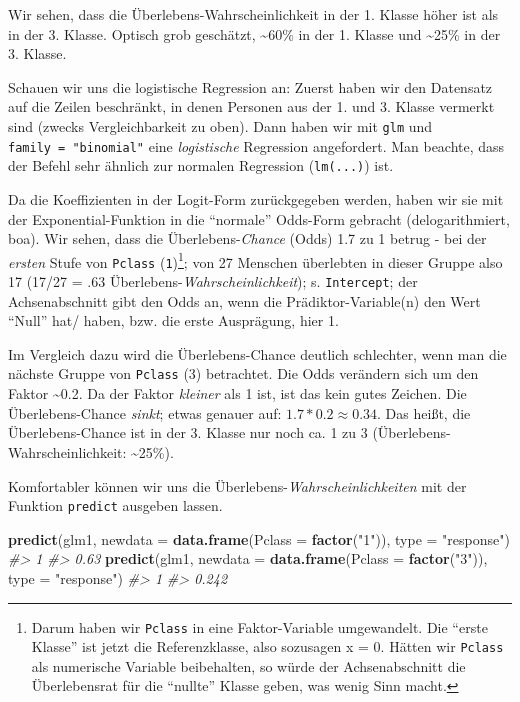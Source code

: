 \documentclass[12pt,ngerman,]{book}
\makeatletter
\newenvironment{Shaded}{\begin{snugshade}}{\end{snugshade}}
\newcommand{\KeywordTok}[1]{\textcolor[rgb]{0.13,0.29,0.53}{\textbf{{#1}}}}
\newcommand{\DataTypeTok}[1]{\textcolor[rgb]{0.13,0.29,0.53}{{#1}}}
\newcommand{\StringTok}[1]{\textcolor[rgb]{0.31,0.60,0.02}{{#1}}}
\newcommand{\CommentTok}[1]{\textcolor[rgb]{0.56,0.35,0.01}{\textit{{#1}}}}
\newcommand{\NormalTok}[1]{{#1}}
\let\rmarkdownfootnote\footnote%
\def\footnote{\protect\rmarkdownfootnote}
\newenvironment{kframe}{%
\medskip{}
\setlength{\fboxsep}{.8em}
 \def\at@end@of@kframe{}%
 \ifinner\ifhmode%
  \def\at@end@of@kframe{\end{minipage}}%
  \begin{minipage}{\columnwidth}%
 \fi\fi%
 \def\FrameCommand##1{\hskip\@totalleftmargin \hskip-\fboxsep
 \colorbox{shadecolor}{##1}\hskip-\fboxsep
     \hskip-\linewidth \hskip-\@totalleftmargin \hskip\columnwidth}%
 \MakeFramed {\advance\hsize-\width
   \@totalleftmargin\z@ \linewidth\hsize
   \@setminipage}}%
 {\par\unskip\endMakeFramed%
 \at@end@of@kframe}
\renewenvironment{Shaded}{\begin{kframe}}{\end{kframe}}
\makeatother
\begin{document}
Wir sehen, dass die Überlebens-Wahrscheinlichkeit in der 1. Klasse höher
ist als in der 3. Klasse. Optisch grob geschätzt, \textasciitilde{}60\%
in der 1. Klasse und \textasciitilde{}25\% in der 3. Klasse.

Schauen wir uns die logistische Regression an: Zuerst haben wir den
Datensatz auf die Zeilen beschränkt, in denen Personen aus der 1. und 3.
Klasse vermerkt sind (zwecks Vergleichbarkeit zu oben). Dann haben wir
mit \texttt{glm} und \texttt{family\ =\ "binomial"} eine
\emph{logistische} Regression angefordert. Man beachte, dass der Befehl
sehr ähnlich zur normalen Regression (\texttt{lm(...)}) ist.

Da die Koeffizienten in der Logit-Form zurückgegeben werden, haben wir
sie mit der Exponential-Funktion in die ``normale'' Odds-Form gebracht
(delogarithmiert, boa). Wir sehen, dass die Überlebens-\emph{Chance}
(Odds) 1.7 zu 1 betrug - bei der \emph{ersten} Stufe von \texttt{Pclass}
(\texttt{1})\footnote{Darum haben wir \texttt{Pclass} in eine
  Faktor-Variable umgewandelt. Die ``erste Klasse'' ist jetzt die
  Referenzklasse, also sozusagen x = 0. Hätten wir \texttt{Pclass} als
  numerische Variable beibehalten, so würde der Achsenabschnitt die
  Überlebensrat für die ``nullte'' Klasse geben, was wenig Sinn macht.};
von 27 Menschen überlebten in dieser Gruppe also 17 (17/27 = .63
Überlebens-\emph{Wahrscheinlichkeit}); s. \texttt{Intercept}; der
Achsenabschnitt gibt den Odds an, wenn die Prädiktor-Variable(n) den
Wert ``Null'' hat/ haben, bzw. die erste Ausprägung, hier 1.

Im Vergleich dazu wird die Überlebens-Chance deutlich schlechter, wenn
man die nächste Gruppe von \texttt{Pclass} (3) betrachtet. Die Odds
verändern sich um den Faktor \textasciitilde{}0.2. Da der Faktor
\emph{kleiner} als 1 ist, ist das kein gutes Zeichen. Die
Überlebens-Chance \emph{sinkt}; etwas genauer auf:
\(1.7 * 0.2 \approx 0.34\). Das heißt, die Überlebens-Chance ist in der
3. Klasse nur noch ca. 1 zu 3 (Überlebens-Wahrscheinlichkeit:
\textasciitilde{}25\%).

Komfortabler können wir uns die Überlebens-\emph{Wahrscheinlichkeiten}
mit der Funktion \texttt{predict} ausgeben lassen.

\begin{Shaded}
\begin{Highlighting}[]
\KeywordTok{predict}\NormalTok{(glm1, }\DataTypeTok{newdata =} \KeywordTok{data.frame}\NormalTok{(}\DataTypeTok{Pclass =} \KeywordTok{factor}\NormalTok{(}\StringTok{"1"}\NormalTok{)), }\DataTypeTok{type =} \StringTok{"response"}\NormalTok{)}
\CommentTok{#>    1 }
\CommentTok{#> 0.63}
\KeywordTok{predict}\NormalTok{(glm1, }\DataTypeTok{newdata =} \KeywordTok{data.frame}\NormalTok{(}\DataTypeTok{Pclass =} \KeywordTok{factor}\NormalTok{(}\StringTok{"3"}\NormalTok{)), }\DataTypeTok{type =} \StringTok{"response"}\NormalTok{)}
\CommentTok{#>     1 }
\CommentTok{#> 0.242}
\end{Highlighting}
\end{Shaded}
\end{document}
